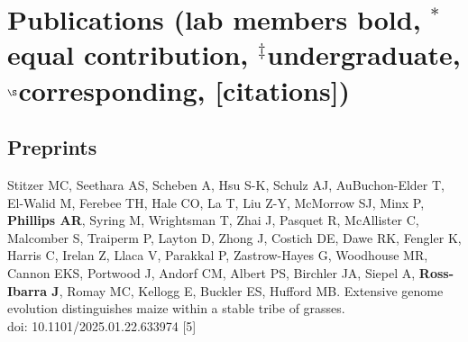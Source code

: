 \documentclass[letterpaper,10pt]{article}
\renewenvironment{itemize}{
  \begin{list}{}{
    \setlength{\leftmargin}{1.5em}
  }
}{
  \end{list}
}
\begin{document}
\begin{itemize}

\end{itemize}

\newpage
\section*{Publications {\small(lab members bold, $^*$equal contribution, $^\ddagger$undergraduate, $^\S$corresponding, [citations])}}


\subsection*{Preprints}
\begin{itemize}
  \setlength\itemsep{0ex}

  \item Stitzer MC, Seethara AS, Scheben A, Hsu S-K, Schulz AJ, AuBuchon-Elder T,   El-Walid M, Ferebee TH, Hale CO,  La T,  Liu Z-Y,  McMorrow SJ,  Minx P, \textbf{Phillips AR},  Syring M,  Wrightsman T,  Zhai J,  Pasquet R,  McAllister C,  Malcomber S,  Traiperm P,  Layton D,  Zhong J,  Costich DE, Dawe RK,  Fengler K,  Harris C,  Irelan Z,  Llaca V,  Parakkal P,  Zastrow-Hayes G,  Woodhouse MR,  Cannon EKS,  Portwood J,  Andorf CM,  Albert PS, Birchler JA,  Siepel A, \textbf{Ross-Ibarra J}, Romay MC,  Kellogg E,  Buckler ES, Hufford MB.  Extensive genome evolution distinguishes maize within a stable tribe of grasses. \\ doi: 10.1101/2025.01.22.633974  
 [5]\\

\end{itemize}
\end{document}
